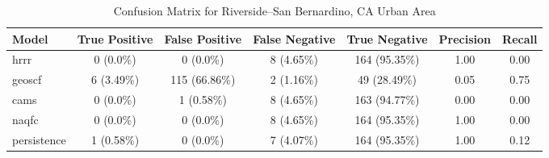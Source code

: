\begin{table}[h!]
\centering
\begin{tabular}{lcccccc}
\hline
Model & True Positive & False Positive & False Negative & True Negative & Precision & Recall\\ \hline
hrrr & 0 (0.0\%) & 0 (0.0\%) & 8 (4.65\%) & 164 (95.35\%) & \cellcolor{green!25}1.00 & \cellcolor{red!25}0.00 \\ 
geoscf & 6 (3.49\%) & 115 (66.86\%) & 2 (1.16\%) & 49 (28.49\%) & \cellcolor{red!25}0.05 & \cellcolor{green!25}0.75 \\ 
cams & 0 (0.0\%) & 1 (0.58\%) & 8 (4.65\%) & 163 (94.77\%) & \cellcolor{red!25}0.00 & \cellcolor{red!25}0.00 \\ 
naqfc & 0 (0.0\%) & 0 (0.0\%) & 8 (4.65\%) & 164 (95.35\%) & \cellcolor{green!25}1.00 & \cellcolor{red!25}0.00 \\ 
persistence & 1 (0.58\%) & 0 (0.0\%) & 7 (4.07\%) & 164 (95.35\%) & 1.00 & 0.12 \\ 
\hline
\end{tabular}
\caption{Confusion Matrix for Riverside--San Bernardino, CA Urban Area}
\end{table}
